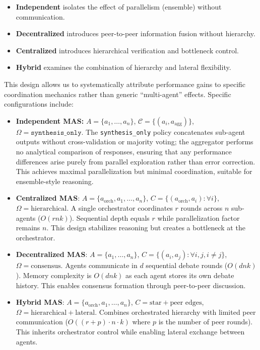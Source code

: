 \begin{itemize}
    \item \textbf{Independent} isolates the effect of parallelism (ensemble) without communication.
    \item \textbf{Decentralized} introduces peer-to-peer information fusion without hierarchy.
    \item \textbf{Centralized} introduces hierarchical verification and bottleneck control.
    \item \textbf{Hybrid} examines the combination of hierarchy and lateral flexibility.
\end{itemize}

This design allows us to systematically attribute performance gains to specific coordination mechanics rather than generic ``multi-agent'' effects. Specific configurations include:
\begin{itemize}
    \item \textbf{Independent MAS:} $A = \{a_1, \ldots, a_n\}$, $\mathcal{C} = \{(a_i, a_{\text{agg}})\}$, $\Omega = \texttt{synthesis\_only}$. The \texttt{synthesis\_only} policy concatenates sub-agent outputs without cross-validation or majority voting; the aggregator performs no analytical comparison of responses, ensuring that any performance differences arise purely from parallel exploration rather than error correction. This achieves maximal parallelization but minimal coordination, suitable for ensemble-style reasoning.
    \item \textbf{Centralized MAS}: $A = \{a_{\text{orch}}, a_1,\ldots,a_n\}$, $C = \{(a_{\text{orch}}, a_i) : \forall i\}$, $\Omega = \text{hierarchical}$. A single orchestrator coordinates $r$ rounds across $n$ sub-agents ($O(rnk)$). Sequential depth equals $r$ while parallelization factor remains $n$. This design stabilizes reasoning but creates a bottleneck at the orchestrator.
    \item \textbf{Decentralized MAS}: $A = \{a_1,\ldots,a_n\}$, $C = \{(a_i, a_j) : \forall i,j, i \neq j\}$, $\Omega = \text{consensus}$. Agents communicate in $d$ sequential debate rounds ($O(dnk)$). Memory complexity is $O(dnk)$ as each agent stores its own debate history. This enables consensus formation through peer-to-peer discussion.
    \item \textbf{Hybrid MAS}: $A = \{a_{\text{orch}}, a_1,\ldots,a_n\}$, $C = \text{star} + \text{peer edges}$, $\Omega = \text{hierarchical} + \text{lateral}$. Combines orchestrated hierarchy with limited peer communication ($O((r+p) \cdot n \cdot k)$ where $p$ is the number of peer rounds). This inherits orchestrator control while enabling lateral exchange between agents.
\end{itemize}

